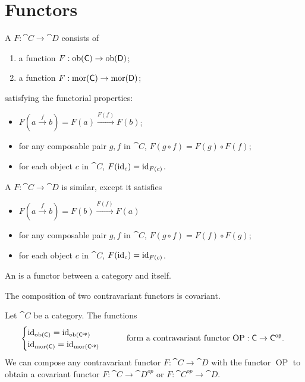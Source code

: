 \section{Functors}
\begin{definition}
A  $F:\cat{C}\to\cat{D}$ consists of
\begin{enumerate}
\item a function $F: \operatorname{ob}(\mathsf{C}) \to \operatorname{ob}(\mathsf{D})$;
\item a function $F: \operatorname{mor}(\mathsf{C}) \to \operatorname{mor}(\mathsf{D})$;
\end{enumerate}
satisfying the functorial properties:
\begin{itemize}
\item $F(a \overset{f}{\longrightarrow} b) = F(a) \overset{F(f)}{\longrightarrow} F(b)$;
\item for any composable pair $g,f$ in $\cat{C}$, $F(g\circ f) = F(g)\circ F(f)$;
\item for each object $c$ in $\cat{C}$, $F(\operatorname{id}_c) = \operatorname{id}_{F(c)}$.
\end{itemize}
A  $F:\cat{C}\to\cat{D}$ is similar, except it satisfies
\begin{itemize}
\item $F(a \overset{f}{\longrightarrow} b) = F(b) \overset{F(f)}{\longrightarrow} F(a)$
\item for any composable pair $g,f$ in $\cat{C}$, $F(g\circ f) = F(f)\circ F(g)$;
\item for each object $c$ in $\cat{C}$, $F(\operatorname{id}_c) = \operatorname{id}_{F(c)}$.
\end{itemize}
An  is a functor between a category and itself.
\end{definition}

\begin{lemma}
The composition of two contravariant functors is covariant.
\end{lemma}

\begin{lemma}
Let $\cat{C}$ be a category. The functions
\[ \begin{cases}
\operatorname{id}_{\operatorname{ob}(\mathsf{C})} = \operatorname{id}_{\operatorname{ob}(\mathsf{C^{op}})} \\
\operatorname{id}_{\operatorname{mor}(\mathsf{C})} = \operatorname{id}_{\operatorname{mor}(\mathsf{C^{op}})}
\end{cases} \qquad \text{form a contravariant functor $\operatorname{OP}: \mathsf{C} \to \mathsf{C^{op}}$.
} \]
We can compose any contravariant functor $F: \cat{C} \to \cat{D}$ with the functor $\operatorname{OP}$ to obtain a covariant functor $F: \cat{C} \to \cat{D^{op}}$ or $F: \cat{C^{op}} \to \cat{D}$.
\end{lemma}

